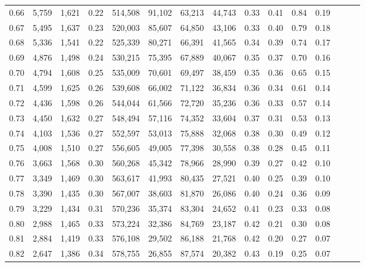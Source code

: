 \begin{tabular}{rrrrrrrrrrrrrrr}
0.66 &   5,759 &  1,621 &  0.22 &  514,508 &   91,102 &   63,213 &   44,743 &  0.33 &  0.41 &  0.84 &      0.19 \\
0.67 &   5,495 &  1,637 &  0.23 &  520,003 &   85,607 &   64,850 &   43,106 &  0.33 &  0.40 &  0.79 &      0.18 \\
0.68 &   5,336 &  1,541 &  0.22 &  525,339 &   80,271 &   66,391 &   41,565 &  0.34 &  0.39 &  0.74 &      0.17 \\
0.69 &   4,876 &  1,498 &  0.24 &  530,215 &   75,395 &   67,889 &   40,067 &  0.35 &  0.37 &  0.70 &      0.16 \\
0.70 &   4,794 &  1,608 &  0.25 &  535,009 &   70,601 &   69,497 &   38,459 &  0.35 &  0.36 &  0.65 &      0.15 \\
0.71 &   4,599 &  1,625 &  0.26 &  539,608 &   66,002 &   71,122 &   36,834 &  0.36 &  0.34 &  0.61 &      0.14 \\
0.72 &   4,436 &  1,598 &  0.26 &  544,044 &   61,566 &   72,720 &   35,236 &  0.36 &  0.33 &  0.57 &      0.14 \\
0.73 &   4,450 &  1,632 &  0.27 &  548,494 &   57,116 &   74,352 &   33,604 &  0.37 &  0.31 &  0.53 &      0.13 \\
0.74 &   4,103 &  1,536 &  0.27 &  552,597 &   53,013 &   75,888 &   32,068 &  0.38 &  0.30 &  0.49 &      0.12 \\
0.75 &   4,008 &  1,510 &  0.27 &  556,605 &   49,005 &   77,398 &   30,558 &  0.38 &  0.28 &  0.45 &      0.11 \\
0.76 &   3,663 &  1,568 &  0.30 &  560,268 &   45,342 &   78,966 &   28,990 &  0.39 &  0.27 &  0.42 &      0.10 \\
0.77 &   3,349 &  1,469 &  0.30 &  563,617 &   41,993 &   80,435 &   27,521 &  0.40 &  0.25 &  0.39 &      0.10 \\
0.78 &   3,390 &  1,435 &  0.30 &  567,007 &   38,603 &   81,870 &   26,086 &  0.40 &  0.24 &  0.36 &      0.09 \\
0.79 &   3,229 &  1,434 &  0.31 &  570,236 &   35,374 &   83,304 &   24,652 &  0.41 &  0.23 &  0.33 &      0.08 \\
0.80 &   2,988 &  1,465 &  0.33 &  573,224 &   32,386 &   84,769 &   23,187 &  0.42 &  0.21 &  0.30 &      0.08 \\
0.81 &   2,884 &  1,419 &  0.33 &  576,108 &   29,502 &   86,188 &   21,768 &  0.42 &  0.20 &  0.27 &      0.07 \\
0.82 &   2,647 &  1,386 &  0.34 &  578,755 &   26,855 &   87,574 &   20,382 &  0.43 &  0.19 &  0.25 &      0.07 \\

\end{tabular}
